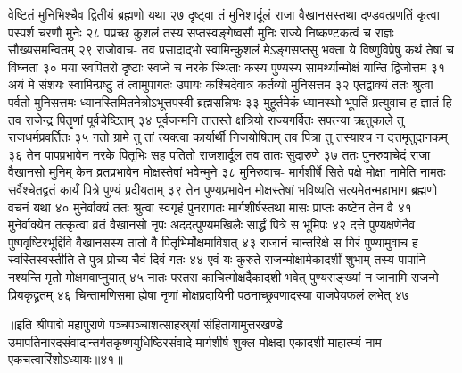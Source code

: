 वेष्टितं मुनिभिश्चैव द्वितीयं ब्रह्मणो यथा २७
दृष्ट्वा तं मुनिशार्दूलं राजा वैखानसस्तथा 
दण्डवत्प्रणतिं कृत्वा पस्पर्श चरणौ मुनेः २८
पप्रच्छ कुशलं तस्य सप्तस्वङ्गेष्वसौ मुनिः 
राज्ये निष्कण्टकत्वं च राज्ञः सौख्यसमन्वितम् २९
राजोवाच-
तव प्रसादाद्भो स्वामिन्कुशलं मेऽङ्गसप्तसु 
भक्ता ये विष्णुविप्रेषु कथं तेषां च विघ्नता ३०
मया स्वपितरो दृष्टाः स्वप्ने च नरके स्थिताः 
कस्य पुण्यस्य सामर्थ्यान्मोक्षं यान्ति द्विजोत्तम ३१
अयं मे संशयः स्वामिन्प्रष्टुं तं त्वामुपागतः 
उपायः कश्चिदेवात्र कर्तव्यो मुनिसत्तम ३२
एतद्वाक्यं ततः श्रुत्वा पर्वतो मुनिसत्तमः 
ध्यानस्तिमितनेत्रोऽभूत्तपस्वी ब्रह्मसन्निभः ३३
मुहूर्तमेकं ध्यानस्थो भूपतिं प्रत्युवाच ह 
ज्ञातं हि तव राजेन्द्र पितॄणां पूर्वचेष्टितम् ३४
पूर्वजन्मनि तातस्ते क्षत्रियो राज्यगर्वितः 
सपत्न्या ऋतुकाले तु राजधर्मप्रवर्तितः ३५
गतो ग्रामे तु तां त्यक्त्वा कार्यार्थी निजयोषितम् 
तव पित्रा तु तस्याश्च न दत्तमृतुदानकम् ३६
तेन पापप्रभावेन नरके पितृभिः सह 
पतितो राजशार्दूल तव तातः सुदारुणे ३७
ततः पुनरुवाचेदं राजा वैखानसो मुनिम् 
केन व्रतप्रभावेन मोक्षस्तेषां भवेन्मुने ३८
मुनिरुवाच-
मार्गशीर्षे सिते पक्षे मोक्षा नामेति नामतः 
सर्वैश्चेतद्व्रतं कार्यं पित्रे पुण्यं प्रदीयताम् ३९
तेन पुण्यप्रभावेन मोक्षस्तेषां भविष्यति 
सत्यमेतन्महाभाग ब्रह्मणो वचनं यथा ४०
मुनेर्वाक्यं ततः श्रुत्वा स्वगृहं पुनरागतः 
मार्गशीर्षस्तथा मासः प्राप्तः कष्टेन तेन वै ४१
मुनेर्वाक्येन तत्कृत्वा व्रतं वैखानसो नृपः 
अददत्पुण्यमखिलैः सार्द्धं पित्रे स भूमिपः ४२
दत्ते पुण्यक्षणेनैव पुष्पवृष्टिरभूद्दिवि 
वैखानसस्य तातो वै पितृभिर्मोक्षमाविशत् ४३
राजानं चान्तरिक्षे स गिरं पुण्यामुवाच ह 
स्वस्तिस्वस्तीति ते पुत्र प्रोच्य चैवं दिवं गतः ४४
एवं यः कुरुते राजन्मोक्षामेकादशीं शुभाम् 
तस्य पापानि नश्यन्ति मृतो मोक्षमवाप्नुयात् ४५
नातः परतरा काचित्मोक्षदैकादशी भवेत् 
पुण्यसङ्ख्यां न जानामि राजन्मे प्रियकृद्व्रतम् ४६
चिन्तामणिसमा ह्येषा नृणां मोक्षप्रदायिनी 
पठनाच्छ्रवणादस्या वाजपेयफलं लभेत् ४७

॥इति श्रीपाद्मे महापुराणे पञ्चपञ्चाशत्साहस्र्यां संहितायामुत्तरखण्डे उमापतिनारदसंवादान्तर्गतकृष्णयुधिष्ठिरसंवादे मार्गशीर्ष-शुक्ल-मोक्षदा-एकादशी-माहात्म्यं नाम एकचत्वारिंशोऽध्यायः॥४१॥



